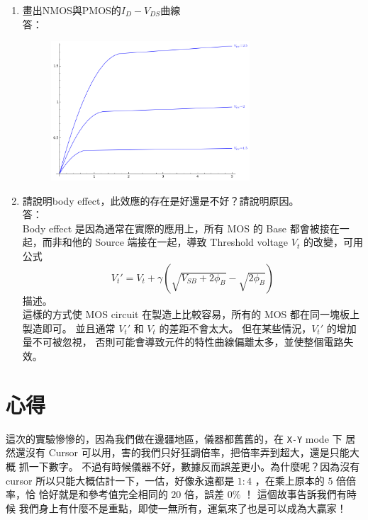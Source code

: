 \documentclass[12pt, a4paper]{article}
\begin{document}
\begin{enumerate}[itemsep=20pt, topsep=10pt]
  \item {畫出NMOS與PMOS的$I_D-V_{DS}$曲線} \\[10pt]
    答：\\
    \begin{figure}[H]
    \begin{center}
      \includegraphics[width=0.7\textwidth]{p1.png}
    \end{center}
    \caption{}
    \end{figure}

  \item {請說明body effect，此效應的存在是好還是不好？請說明原因。} \\[10pt]
    答：\\
    Body effect 是因為通常在實際的應用上，所有 MOS 的 Base 都會被接在一起，而非和他的
    Source 端接在一起，導致 Threshold voltage $V_t$ 的改變，可用公式
    \[ V_t' = V_t + \gamma \left( \sqrt{V_{SB} + 2 \phi_B } - \sqrt{2 \phi_B} \right) \]
    描述。\\
    這樣的方式使 MOS circuit 在製造上比較容易，所有的 MOS 都在同一塊板上製造即可。
    並且通常 $V_t'$ 和 $V_t$ 的差距不會太大。 但在某些情況，$V_t'$ 的增加量不可被忽視，
    否則可能會導致元件的特性曲線偏離太多，並使整個電路失效。

\end{enumerate}

\section{心得}
這次的實驗慘慘的，因為我們做在邊疆地區，儀器都舊舊的，在 \texttt{X-Y} mode 下
居然還沒有 Cursor 可以用，害的我們只好狂調倍率，把倍率弄到超大，還是只能大概
抓一下數字。 不過有時候儀器不好，數據反而誤差更小。為什麼呢？因為沒有 cursor
所以只能大概估計一下，一估，好像永遠都是 $1:4$ ，在乘上原本的 $5$ 倍倍率，恰
恰好就是和參考值完全相同的 $20$ 倍，誤差 $0 \%$ ！ 這個故事告訴我們有時候
我們身上有什麼不是重點，即使一無所有，運氣來了也是可以成為大贏家！
\end{document}
